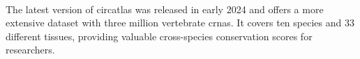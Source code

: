 \paragraph{}
The latest version of \gls{circatlas} was released in early 2024 and offers a
more extensive dataset with three million vertebrate \glspl{crna}.
It covers ten species and 33 different tissues, providing valuable
cross-species conservation scores for researchers\supercite{wu_circatlas_2023}.
